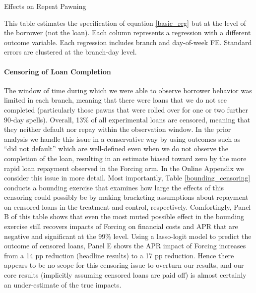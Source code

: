 \documentclass[12pt, a4paper]{article}
\begin{document}
\begin{table}
\caption{Effects on Repeat Pawning}
\label{repeat_loans}
\begin{center}
\footnotesize{}
\end{center}
 \footnotesize{This table estimates the specification of equation \ref{basic_reg} but at the level of the borrower (not the loan). Each column represents a regression with a different outcome variable.
 Each regression includes branch and day-of-week FE. Standard errors are clustered at the branch-day level.}
\end{table}

\paragraph*{Censoring of Loan Completion}
The window of time during which we were able to observe borrower behavior was limited in each branch, meaning that there were loans that we do not see completed (particularly those pawns that were rolled over for one or two further 90-day spells).  Overall, 13\% of all experimental loans are censored, meaning that they neither default nor repay within the observation window.  In the prior analysis we handle this issue in a conservative way by using outcomes such as ``did not default'' which are well-defined even when we do not observe the completion of the loan, resulting in an estimate biased toward zero by the more rapid loan repayment observed in the Forcing arm.  In the Online Appendix we consider this issue in more detail.  Most importantly, Table \ref{bounding_censoring} conducts a bounding exercise that examines how large the effects of this censoring could possibly be by making bracketing assumptions about repayment on censored loans in the treatment and control, respectively.  Comfortingly, Panel B of this table shows that even the most muted possible effect in the bounding exercise still recovers impacts of Forcing on financial costs and APR that are negative and significant at the 99\% level.  Using a lasso-logit model to predict the outcome of censored loans, Panel E shows the APR impact of Forcing increases from a 14 pp reduction (headline results) to a 17 pp reduction.  Hence there appears to be no scope for this censoring issue to overturn our results, and our core results (implicitly assuming censored loans are paid off) is almost certainly an under-estimate of the true impacts.
\end{document}
